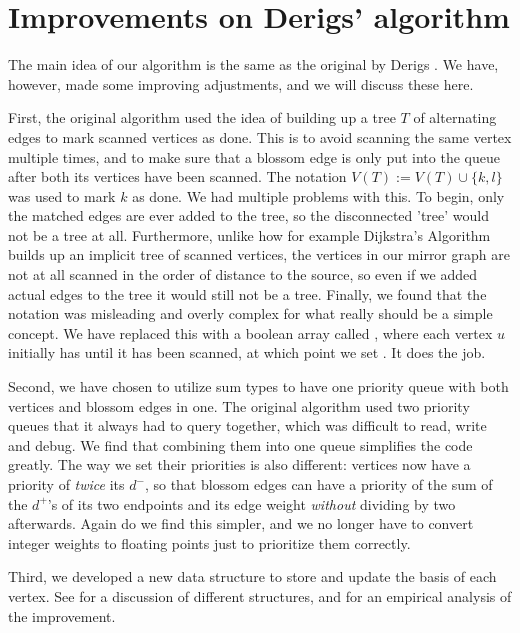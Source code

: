 \section{Improvements on Derigs' algorithm}
The main idea of our algorithm is the same as the original by Derigs \cite{source:derigs_shortest_odd_path}. We have, however, made some improving adjustments, and we will discuss these here.

First, the original algorithm used the idea of building up a tree $T$ of alternating edges to mark scanned vertices as done. This is to avoid scanning the same vertex multiple times, and to make sure that a blossom edge is only put into the queue after both its vertices have been scanned. The notation $V(T) := V(T) \cup \{k,l\}$ was used to mark $k$ as done. We had multiple problems with this. To begin, only the matched edges are ever added to the tree, so the disconnected 'tree' would not be a tree at all. Furthermore, unlike how for example Dijkstra's Algorithm builds up an implicit tree of scanned vertices, the vertices in our mirror graph are not at all scanned in the order of distance to the source, so even if we added actual edges to the tree it would still not be a tree. Finally, we found that the notation was misleading and overly complex for what really should be a simple concept. We have replaced this with a boolean array called , where each vertex $u$ initially has  until it has been scanned, at which point we set . It does the job.

Second, we have chosen to utilize sum types to have one priority queue with both vertices and blossom edges in one. The original algorithm used two priority queues that it always had to query together, which was difficult to read, write and debug. We find that combining them into one queue simplifies the code greatly. The way we set their priorities is also different: vertices now have a priority of \emph{twice} its $d^-$, so that blossom edges can have a priority of the sum of the $d^+$'s of its two endpoints and its edge weight \emph{without} dividing by two afterwards. Again do we find this simpler, and we no longer have to convert integer weights to floating points just to prioritize them correctly.

Third, we developed a new data structure to store and update the basis of each vertex. See  for a discussion of different structures, and  for an empirical analysis of the improvement.

